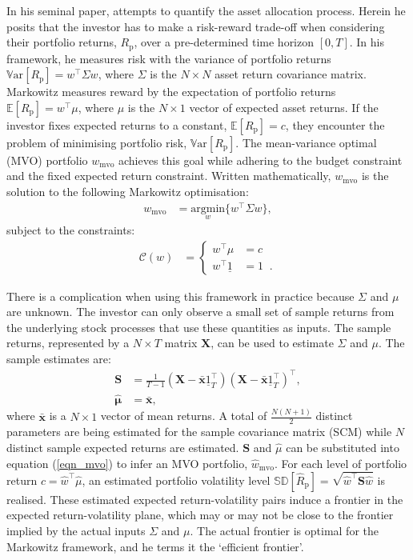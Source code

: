 \documentclass[a4paper,11pt,nocenter,bold,noupper,headcount]{mythesis}
\theoremstyle{plain}
\theoremstyle{definition}
\begin{document}
In his seminal paper, \cite{M52} attempts to quantify the asset allocation process. Herein he posits that the investor has to make a risk-reward trade-off when considering their portfolio returns, $R_\mathrm{p}$, over a pre-determined time horizon $[0, T]$. In his framework, he measures risk with the variance of portfolio returns $\mathbb{V}\mathrm{ar}[R_\mathrm{p}] = w^\intercal \Sigma w$, where $\Sigma$ is the $N \times N$ asset return covariance matrix. Markowitz measures reward by the expectation of portfolio returns $ \mathbb{E}[R_\mathrm{p}] = w^\intercal \mu$, where $\mu$ is the $N \times 1$ vector of expected asset returns. If the investor fixes expected returns to a constant, $\mathbb{E}[R_\mathrm{p}] = c$, they encounter the problem of minimising portfolio risk, $\mathbb{V}\mathrm{ar}[R_\mathrm{p}]$. The mean-variance optimal (MVO) portfolio $w_\mathrm{mvo}$ achieves this goal while adhering to the budget constraint and the fixed expected return constraint. Written mathematically, $w_\mathrm{mvo}$ is the solution to the following Markowitz optimisation:
\begin{align} \label{eqn_mvo}
w_\mathrm{mvo} &= \underset{w}{\text{argmin}} \Big \{ w^\intercal \Sigma w \Big \},
\end{align}
subject to the constraints:
\begin{align*}
\mathcal{C}(w) &= 
\begin{cases}
 w^\intercal \mu &= c \;\;\;  \\
w^\intercal \underline{1} &= 1 \;\; .
\end{cases}
\end{align*}

There is a complication when using this framework in practice because $\Sigma$ and $\mu$ are unknown. The investor can only observe a small set of sample returns from the underlying stock processes that use these quantities as inputs. The sample returns, represented by a $N \times T$ matrix $\textbf{X}$, can be used to estimate $\Sigma$ and $\mu$. The sample estimates are:
\begin{align}
\textbf{S}&=  \frac{1}{T - 1}(\textbf{X} - \mathbf{\bar{x}} \underline{1}^\intercal_T)(\textbf{X} - \mathbf{\bar{x}} \underline{1}^\intercal_T)^\intercal, \\
\mathbf{\hat{\mu}} &= \mathbf{\bar{x}} ,
\end{align}
where $\mathbf{\bar{x}}$ is a $N \times 1$ vector of mean returns. A total of $\frac{N(N+1)}{2}$ distinct parameters are being estimated for the sample covariance matrix (SCM) while $N$ distinct sample expected returns are estimated. $\textbf{S}$ and $\hat{\mu}$ can be substituted into equation (\ref{eqn_mvo}) to infer an MVO portfolio, $\hat{w}_\mathrm{mvo}$. For each level of portfolio return $c = \hat{w}^\intercal \hat{\mu} $, an estimated portfolio volatility level $\mathbb{SD}[\hat{R}_\mathrm{p}] = \sqrt{\hat{w}^\intercal\textbf{S}\hat{w}}$ is realised. These estimated expected return-volatility pairs induce a frontier in the expected return-volatility plane, which may or may not be close to the frontier implied by the actual inputs $\Sigma$ and $\mu$. The actual frontier is optimal for the Markowitz framework, and he terms it the `efficient frontier'.
\end{document}
